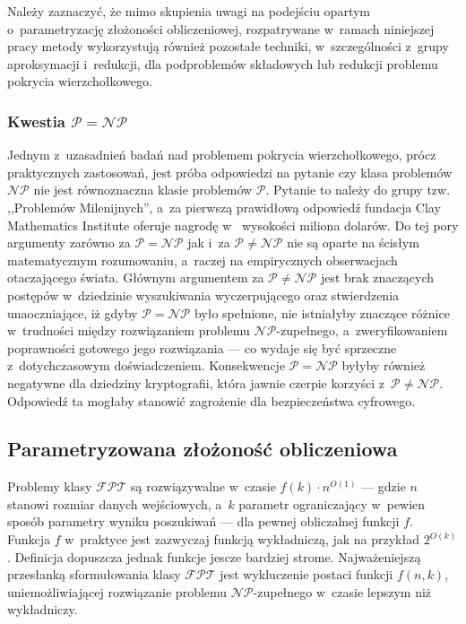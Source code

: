 {Należy zaznaczyć, że mimo skupienia uwagi na podejściu opartym o~parametryzację złożoności obliczeniowej, rozpatrywane w~ramach niniejszej pracy metody wykorzystują również pozostałe techniki, w~szczególności z~grupy aproksymacji i~redukcji, dla podproblemów składowych lub redukcji problemu pokrycia wierzchołkowego.
}
\subsubsection{\textbf{Kwestia $\mathcal{P}=\mathcal{NP}$}}
\label{sss_problem_p_neq_np}
\par{
  Jednym z~uzasadnień badań nad problemem pokrycia wierzchołkowego, prócz
  praktycznych zastosowań, jest próba odpowiedzi na pytanie czy klasa problemów
  $\mathcal{NP}$ nie jest równoznaczna klasie problemów $\mathcal{P}$.
  Pytanie to należy do grupy tzw. ,,Problemów Milenijnych'', a~za pierwszą
  prawidłową odpowiedź fundacja Clay Mathematics Institute oferuje nagrodę w~  wysokości miliona dolarów. 
  Do tej pory argumenty zarówno za $\mathcal{P}=\mathcal{NP}$ jak i~za
  $\mathcal{P}\neq\mathcal{NP}$ nie są oparte na ścisłym matematycznym
  rozumowaniu, a~raczej na empirycznych obserwacjach otaczającego świata.
  Głównym argumentem za $\mathcal{P}\neq\mathcal{NP}$ jest brak znaczących
  postępów w~dziedzinie wyszukiwania wyczerpującego oraz stwierdzenia
  unaoczniające, iż gdyby $\mathcal{P}=\mathcal{NP}$ było spełnione, nie 
  istniałyby znaczące różnice w~trudności między rozwiązaniem 
  problemu $\mathcal{NP}$-zupełnego, a~zweryfikowaniem poprawności gotowego 
  jego rozwiązania --- co wydaje się być sprzeczne z~dotychczasowym doświadczeniem.
  Konsekwencje $\mathcal{P}=\mathcal{NP}$ byłyby również negatywne dla dziedziny
  kryptografii, która jawnie czerpie korzyści z~$\mathcal{P}\neq\mathcal{NP}$.
  Odpowiedź ta mogłaby stanowić zagrożenie dla bezpieczeństwa cyfrowego.
}

\subsection{Parametryzowana złożoność obliczeniowa}
\label{sss_parametric_complexity}
\par{
  Problemy klasy $\mathcal{FPT}$ są rozwiązywalne w~czasie $f(k)\cdot n^{O(1)}$ --- gdzie $n$ stanowi rozmiar danych wejściowych, a~$k$ parametr ograniczający w~pewien sposób parametry wyniku poszukiwań --- dla pewnej obliczalnej funkcji $f$.
  Funkcja $f$ w~praktyce jest zazwyczaj funkcją wykładniczą, jak na przykład $2^{O(k)}$.
  Definicja dopuszcza jednak funkcje jescze bardziej strome.
  Najważeniejszą przesłanką sformułowania klasy $\mathcal{FPT}$ jest wykluczenie postaci funkcji $f(n,k)$, uniemożliwiającej rozwiązanie problemu $\mathcal{NP}$-zupełnego w~czasie lepszym niż wykładniczy.
}


